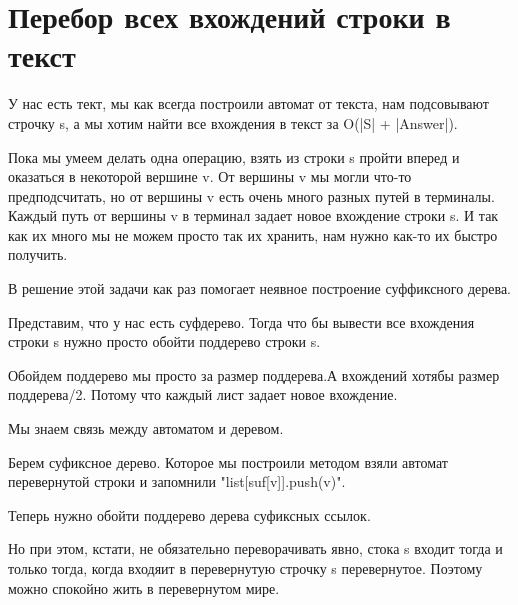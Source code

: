 \section{Перебор всех вхождений строки в текст}

У нас есть тект, мы как всегда построили автомат от текста, 
нам подсовывают строчку s, а мы  хотим найти все 
вхождения в текст за O(|S| + |Answer|). 

Пока мы умеем делать одна операцию, взять из строки s пройти 
вперед и оказаться в некоторой вершине v. От вершины v мы
могли что-то предподсчитать, но от
вершины v есть очень много разных путей в терминалы. Каждый
путь от вершины v в терминал задает новое вхождение строки s.
И так как их много мы не можем просто так их
хранить, нам нужно как-то их быстро получить.   

В решение этой задачи как раз помогает неявное построение суффиксного дерева.

Представим, что у нас есть суфдерево. Тогда что бы вывести 
все вхождения строки s нужно просто обойти поддерево строки s.

Обойдем поддерево мы просто за размер поддерева.А вхождений
хотябы размер поддерева/2. Потому что каждый лист задает новое
вхождение.

Мы знаем связь между автоматом и деревом.    

Берем суфиксное дерево. Которое мы построили методом взяли автомат
перевернутой строки и запомнили \cpp"list[suf[v]].push(v)".  

Теперь нужно обойти поддерево дерева суфиксных ссылок. 

Но при этом, кстати, не обязательно переворачивать явно, 
стока s входит тогда и только тогда, когда 
входяит в перевернутую строчку s перевернутое. Поэтому 
можно спокойно жить в перевернутом мире.

 